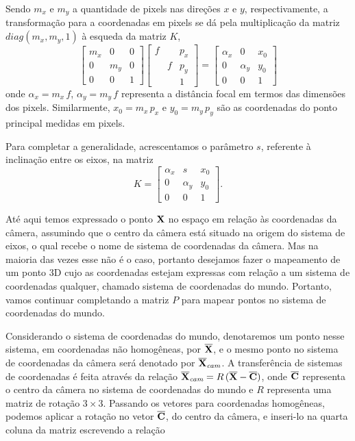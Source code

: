 Sendo $m_x$ e $m_y$ a quantidade de pixels nas direções $x$ e $y$, respectivamente, a transformação para a coordenadas em pixels se dá pela multiplicação da matriz $diag(m_x,m_y,1)$ à esqueda da matriz $K$,
\begin{equation*}
\begin{bmatrix}
m_x&0&0\\
0&m_y&0\\
0&0&1
\end{bmatrix}      
\begin{bmatrix}
f& &p_x\\
&f&p_y\\
& &1
\end{bmatrix}
=
\begin{bmatrix}
\alpha_x&0&x_0\\
0&\alpha_y&y_0\\
0&0&1
\end{bmatrix}
\end{equation*}
onde $\alpha_x=m_x\,f$, $\alpha_y=m_y\,f$ representa a distância focal em termos das dimensões dos pixels. Similarmente, $x_0=m_x\,p_x$ e $y_0=m_y\,p_y$ são as coordenadas do ponto principal medidas em pixels.

Para completar a generalidade, acrescentamos o parâmetro $s$, referente à inclinação entre os eixos, na matriz
\begin{equation*}
K=
\begin{bmatrix}
\alpha_x&s&x_0\\
0&\alpha_y&y_0\\
0&0&1
\end{bmatrix}.
\end{equation*}






Até aqui temos expressado o ponto $\mathbf{X}$ no espaço em relação às coordenadas da câmera, assumindo que o centro da câmera está situado na origem do sistema de eixos, o qual recebe o nome de sistema de coordenadas da câmera. Mas na maioria das vezes esse não é o caso, portanto desejamos fazer o mapeamento de um ponto 3D cujo as coordenadas estejam expressas com relação a um sistema de coordenadas qualquer, chamado sistema de coordenadas do mundo. Portanto, vamos continuar completando a matriz $P$ para mapear pontos no sistema de coordenadas do mundo.

Considerando o sistema de coordenadas do mundo, denotaremos um ponto nesse sistema, em coordenadas não homogêneas, por $\overline{\mathbf{X}}$, e o mesmo ponto no sistema de coordenadas da câmera será denotado por $\overline{\mathbf{X}}_{\textit{cam}}$. A transferência de sistemas de coordenadas é feita através da relação $\overline{\mathbf{X}}_{\textit{cam}}=R\,(\overline{\mathbf{X}}-\overline{\bf C})$, onde $\overline{\bf C}$ representa o centro da câmera no sistema de coordenadas do mundo e $R$ representa uma matriz de rotação $3\times3$. Passando os vetores para coordenadas homogêneas, podemos aplicar a rotação no vetor $\overline{\bf C}$, do centro da câmera, e inseri-lo na quarta coluna da matriz escrevendo a relação

